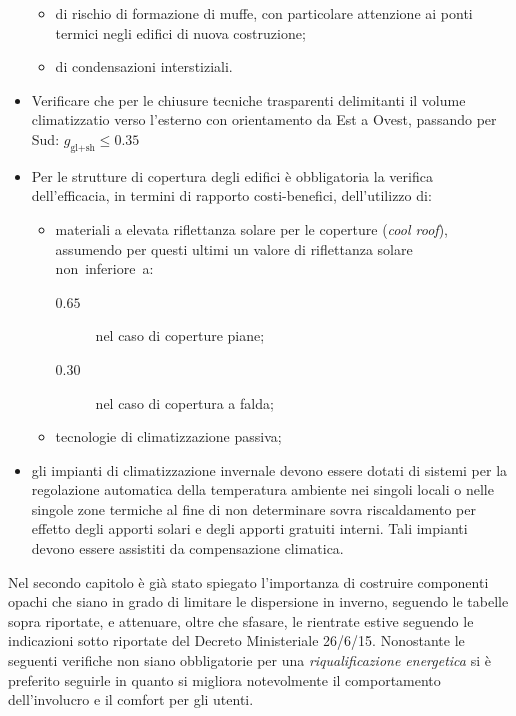 \begin{itemize}
\begin{itemize}
	\item di rischio di formazione di muffe, con particolare attenzione ai ponti termici negli edifici di nuova costruzione;
	\item di condensazioni interstiziali.
\end{itemize}
\item Verificare che per le chiusure tecniche trasparenti delimitanti il volume climatizzatio verso l'esterno con orientamento da Est a Ovest, passando per Sud: $g_{\textrm{gl+sh}}\le 0.35$
\item Per le strutture di copertura degli edifici è obbligatoria la verifica dell'efficacia, in termini di rapporto costi-benefici, dell'utilizzo di:
\begin{itemize}
	\item materiali a elevata riflettanza solare per le coperture (\emph{cool roof}), assumendo per questi ultimi un valore di riflettanza solare non~inferiore~a:
	\begin{description}
		\item[$\mathbf{0.65}$] nel caso di coperture piane;
		\item[$\mathbf{0.30}$] nel caso di copertura a falda;
	\end{description}
	\item tecnologie di climatizzazione passiva;
\end{itemize}
\item gli impianti di climatizzazione invernale devono essere dotati di sistemi per la regolazione automatica della temperatura ambiente nei singoli locali o nelle singole zone termiche al fine di non determinare sovra riscaldamento per effetto degli apporti solari e degli apporti gratuiti interni. Tali impianti devono essere assistiti da compensazione climatica.
\end{itemize}
Nel secondo capitolo è già stato spiegato l'importanza di costruire componenti opachi che siano in grado di limitare le dispersione in inverno, seguendo le tabelle sopra riportate, e attenuare, oltre che sfasare, le rientrate estive seguendo le indicazioni sotto riportate del Decreto Ministeriale 26/6/15. Nonostante le seguenti verifiche non siano obbligatorie per una \emph{riqualificazione energetica} si è preferito seguirle in quanto si migliora notevolmente il comportamento dell'involucro e il comfort per gli utenti.
